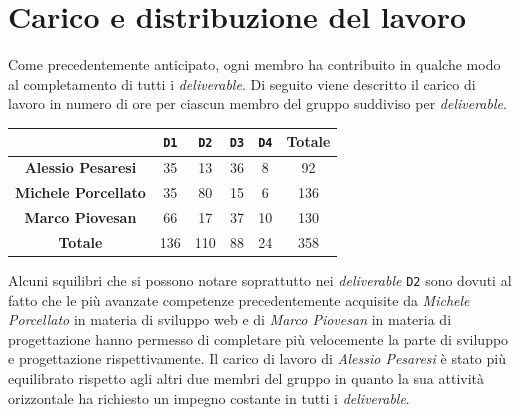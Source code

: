 \section{Carico e distribuzione del lavoro}
\label{caricoLavoro}
Come precedentemente anticipato, ogni membro ha contribuito in qualche modo al completamento di tutti i \textit{deliverable}. Di seguito viene descritto il carico di lavoro in numero di ore per ciascun membro del gruppo suddiviso per \textit{deliverable}.

\begin{table}[H]
    \centering
    \begin{tabular}{|c|c|c|c|c|c|}
        \hline
        & \texttt{D1} & \texttt{D2} & \texttt{D3} & \texttt{D4} & \textbf{Totale}\\
        \hline
        \textbf{Alessio Pesaresi} & 35 & 13 & 36 & 8 & 92\\
        \hline
        \textbf{Michele Porcellato} & 35 & 80 & 15 & 6 & 136\\
        \hline
        \textbf{Marco Piovesan} & 66 & 17 & 37 & 10 & 130\\
        \hline
        \textbf{Totale} & 136 & 110 & 88 & 24 & 358\\
        \hline
    \end{tabular}
\end{table}

Alcuni squilibri che si possono notare soprattutto nei \textit{deliverable} \texttt{D2} sono dovuti al fatto che le più avanzate competenze precedentemente acquisite da \textit{Michele Porcellato} in materia di sviluppo web e di \textit{Marco Piovesan} in materia di progettazione hanno permesso di completare più velocemente la parte di sviluppo e progettazione rispettivamente. Il carico di lavoro di \textit{Alessio Pesaresi} è stato più equilibrato rispetto agli altri due membri del gruppo in quanto la sua attività orizzontale ha richiesto un impegno costante in tutti i \textit{deliverable}.